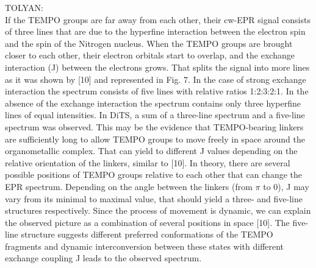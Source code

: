 \par
TOLYAN:\\
If the TEMPO groups are far away from each other, their cw-EPR signal consists of three
lines that are due to the hyperfine interaction between the electron spin and the spin of the Nitrogen
nucleus. When the TEMPO groups are brought closer to each other, their electron orbitals start to
overlap, and the exchange interaction (J) between the electrons grows. That splits the signal into
more lines as it was shown by [10] and represented in Fig. 7. In the case of strong exchange
interaction the spectrum consists of five lines with relative ratios 1:2:3:2:1. In the absence of the
exchange interaction the spectrum contains only three hyperfine lines of equal intensities.
In DiTS, a sum of a three-line spectrum and a five-line spectrum was observed. This may
be the evidence that TEMPO-bearing linkers are sufficiently long to allow TEMPO groups to move
freely in space around the organometallic complex. That can yield to different J values depending
on the relative orientation of the linkers, similar to [10]. In theory, there are several possible
positions of TEMPO groups relative to each other that can change the EPR spectrum. Depending
on the angle between the linkers (from $\pi$ to 0), J may vary from its minimal to maximal value,
that should yield a three- and five-line structures respectively. Since the process of movement is
dynamic, we can explain the observed picture as a combination of several positions in space [10].
The five-line structure suggests different preferred conformations of the TEMPO fragments and
dynamic interconversion between these states with different exchange coupling J leads to the
observed spectrum.


